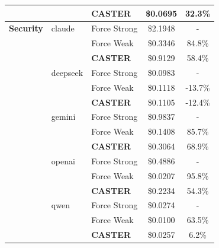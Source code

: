 \documentclass{article}
\theoremstyle{plain}
\theoremstyle{definition}
\theoremstyle{remark}
\begin{document}
\begin{table}[t]
\begin{minipage}{0.48\textwidth}
{\begin{tabular}{lllcc}
         &  & \textbf{CASTER} & \$0.0695 & 32.3\% \\
        \midrule
        \textbf{Security} & claude & Force Strong& \$2.1948 & - \\
         &  & Force Weak & \$0.3346 & 84.8\% \\
         &  & \textbf{CASTER} & \$0.9129 & 58.4\% \\
         & deepseek & Force Strong& \$0.0983 & - \\
         &  & Force Weak & \$0.1118 & -13.7\% \\
         &  & \textbf{CASTER} & \$0.1105 & -12.4\% \\
         & gemini & Force Strong& \$0.9837 & - \\
         &  & Force Weak & \$0.1408 & 85.7\% \\
         &  & \textbf{CASTER} & \$0.3064 & 68.9\% \\
         & openai & Force Strong& \$0.4886 & - \\
         &  & Force Weak & \$0.0207 & 95.8\% \\
         &  & \textbf{CASTER} & \$0.2234 & 54.3\% \\
         & qwen & Force Strong& \$0.0274 & - \\
         &  & Force Weak & \$0.0100 & 63.5\% \\
         &  & \textbf{CASTER} & \$0.0257 & 6.2\% \\
            \bottomrule
        \end{tabular}%
        }
    \end{minipage}
\end{table}
\end{document}
